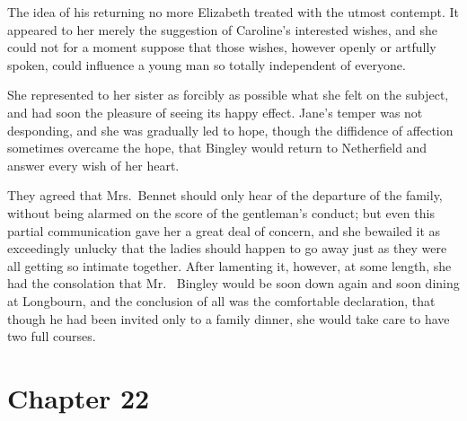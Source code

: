 The idea of his returning no more Elizabeth treated with the
utmost contempt.  It appeared to her merely the suggestion of
Caroline's interested wishes, and she could not for a moment
suppose that those wishes, however openly or artfully spoken,
could influence a young man so totally independent of everyone.

She represented to her sister as forcibly as possible what she
felt on the subject, and had soon the pleasure of seeing its
happy effect.  Jane's temper was not desponding, and she was
gradually led to hope, though the diffidence of affection
sometimes overcame the hope, that Bingley would return to
Netherfield and answer every wish of her heart.

They agreed that Mrs.\ Bennet should only hear of the departure
of the family, without being alarmed on the score of the
gentleman's conduct; but even this partial communication gave
her a great deal of concern, and she bewailed it as exceedingly
unlucky that the ladies should happen to go away just as they
were all getting so intimate together.  After lamenting it,
however, at some length, she had the consolation that Mr.\ %
Bingley would be soon down again and soon dining at Longbourn,
and the conclusion of all was the comfortable declaration,
that though he had been invited only to a family dinner, she
would take care to have two full courses.



\chapter{Chapter 22}



